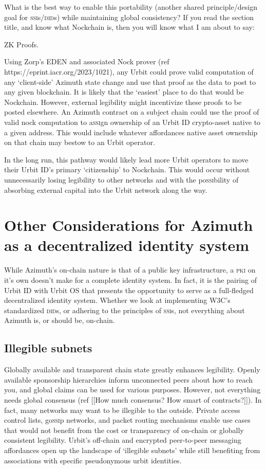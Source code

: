 \documentclass[twoside]{article}
\begin{document}
What is the best way to enable this portability (another shared principle/design goal for \textsc{ssi}s/\textsc{did}s) while maintaining global consistency? If you read the section title, and know what Nockchain is, then you will know what I am about to say:

ZK Proofs.

Using Zorp's EDEN and associated Nock prover (ref https://eprint.iacr.org/2023/1021), any Urbit could prove valid computation of any `client-side' Azimuth state change and use that proof as the data to post to any given blockchain. It is likely that the `easiest' place to do that would be Nockchain. However, external legibility might incentivize these proofs to be posted elsewhere. An Azimuth contract on a subject chain could use the proof of valid nock computation to a\textsc{ssi}gn ownership of an Urbit ID crypto-asset native to a given address. This would include whatever affordances native asset ownership on that chain may bestow to an Urbit operator.

In the long run, this pathway would likely lead more Urbit operators to move their Urbit ID's primary `citizenship' to Nockchain. This would occur without unnecessarily losing legibility to other networks and with the po\textsc{ssi}bility of absorbing external capital into the Urbit network along the way. 

\section{Other Considerations for Azimuth as a decentralized identity system}

While Azimuth's on-chain nature is that of a public key infrastructure, a \textsc{pki} on it's own doesn't make for a complete identity system. In fact, it is the pairing of Urbit ID with Urbit OS that presents the opportunity to serve as a full-fledged decentralized identity system. Whether we look at implementing W3C's standardized \textsc{did}s, or adhering to the principles of \textsc{ssi}s, not everything about Azimuth is, or should be, on-chain.

\subsection{Illegible subnets}

Globally available and transparent chain state greatly enhances legibility. Openly available sponsorship hierarchies inform unconnected peers about how to reach you, and global claims can be used for various purposes. However, not everything needs global consensus (ref [[How much consensus? How smart of contracts?]]). In fact, many networks may want to be illegible to the outside. Private access control lists, go\textsc{ssi}p networks, and packet routing mechanisms enable use cases that would not benefit from the cost or transparency of on-chain or globally consistent legibility. Urbit's off-chain and encrypted peer-to-peer messaging affordances open up the landscape of `illegible subnets' while still benefiting from associations with specific pseudonymous urbit identities.
\end{document}
